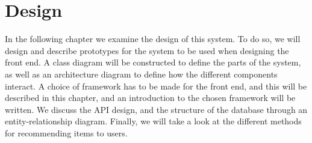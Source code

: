 \chapter{Design}\label{ch:design}
In the following chapter we examine the design of this system.
To do so, we will design and describe prototypes for the system to be used when designing the front end.
A class diagram will be constructed to define the parts of the system, as well as an architecture diagram to define how the different components interact.
A choice of framework has to be made for the front end, and this will be described in this chapter, and an introduction to the chosen framework will be written.
We discuss the API design, and the structure of the database through an entity-relationship diagram.
Finally, we will take a look at the different methods for recommending items to users.









